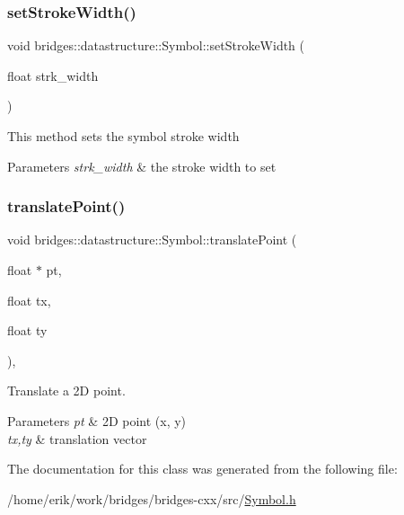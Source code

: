 \subsubsection{\texorpdfstring{set\+Stroke\+Width()}{setStrokeWidth()}}
{\footnotesize\ttfamily void bridges\+::datastructure\+::\+Symbol\+::set\+Stroke\+Width (\begin{DoxyParamCaption}\item[{float}]{strk\+\_\+width }\end{DoxyParamCaption})\hspace{0.3cm}{\ttfamily [inline]}}

This method sets the symbol stroke width


\begin{DoxyParams}{Parameters}
{\em strk\+\_\+width} & the stroke width to set \\
\hline
\end{DoxyParams}
\mbox{\label{classbridges_1_1datastructure_1_1_symbol_a3331549f82faa00d8fee5f51ca547cb0}} 
\subsubsection{\texorpdfstring{translate\+Point()}{translatePoint()}}
{\footnotesize\ttfamily void bridges\+::datastructure\+::\+Symbol\+::translate\+Point (\begin{DoxyParamCaption}\item[{float $\ast$}]{pt,  }\item[{float}]{tx,  }\item[{float}]{ty }\end{DoxyParamCaption})\hspace{0.3cm}{\ttfamily [inline]}, {\ttfamily [protected]}}



Translate a 2D point. 


\begin{DoxyParams}{Parameters}
{\em pt} & 2D point (x, y) \\
\hline
{\em tx,ty} & translation vector \\
\hline
\end{DoxyParams}


The documentation for this class was generated from the following file\+:\begin{DoxyCompactItemize}
\item 
/home/erik/work/bridges/bridges-\/cxx/src/\hyperlink{_symbol_8h}{Symbol.\+h}\end{DoxyCompactItemize}
